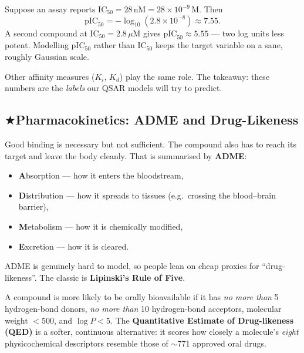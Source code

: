 \documentclass[11pt, oneside]{book}
\makeatletter
\newcommand{\starglyph}{\textcolor{stargold}{\ensuremath{\bigstar}}}
\newcommand{\starsec}[1]{%
  \texorpdfstring{\starglyph\hspace{0.4em}\textcolor{star@frame}{#1}}{#1}}
\makeatother
\begin{document}
\begin{exbox}[title={From IC$_{50}$ to pIC$_{50}$}]
Suppose an assay reports $\mathrm{IC}_{50} = 28\,\text{nM} = 28\times10^{-9}\,$M.
Then
\[
  \mathrm{pIC}_{50} = -\log_{10}\!\left(2.8\times10^{-8}\right) \approx 7.55 .
\]
A second compound at $\mathrm{IC}_{50} = 2.8\,\mu$M gives
$\mathrm{pIC}_{50}\approx 5.55$ --- two log units less potent. Modelling pIC$_{50}$
rather than IC$_{50}$ keeps the target variable on a sane, roughly Gaussian scale.
\end{exbox}

Other affinity measures ($K_i$, $K_d$) play the same role. The takeaway: these
numbers are the \emph{labels} our QSAR models will try to predict.

\newpage

\subsection{\starsec{Pharmacokinetics: ADME and Drug-Likeness}}

Good binding is necessary but not sufficient. The compound also has to reach its
target and leave the body cleanly. That is summarised by \textbf{ADME}:

\begin{itemize}
  \item \textbf{A}bsorption --- how it enters the bloodstream,
  \item \textbf{D}istribution --- how it spreads to tissues (e.g.\ crossing the
        blood--brain barrier),
  \item \textbf{M}etabolism --- how it is chemically modified,
  \item \textbf{E}xcretion --- how it is cleared.
\end{itemize}

ADME is genuinely hard to model, so people lean on cheap proxies for
``drug-likeness''. The classic is \textbf{Lipinski's Rule of Five}.

\begin{defbox}[title={Lipinski's Rule of Five (Ro5)}]
A compound is more likely to be orally bioavailable if it has
\emph{no more than} 5 hydrogen-bond donors, \emph{no more than} 10 hydrogen-bond
acceptors, molecular weight $< 500$, and $\log P < 5$. The
\textbf{Quantitative Estimate of Drug-likeness (QED)} is a softer, continuous
alternative: it scores how closely a molecule's \emph{eight} physicochemical descriptors resemble those of
$\sim$771 approved oral drugs.
\end{defbox}
\end{document}
